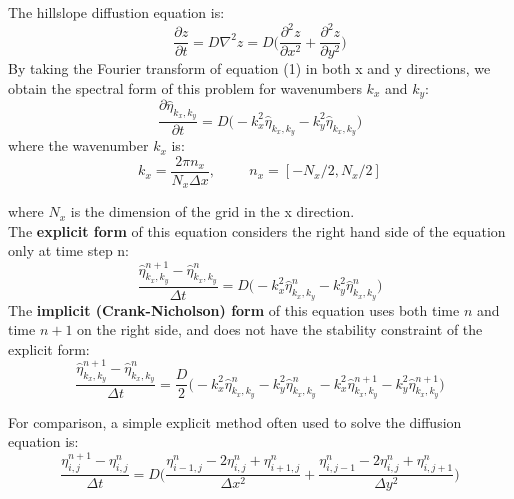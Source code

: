 \documentclass{article}
\begin{document}
The hillslope diffustion equation is:
\begin{equation}
    \frac{\partial z}{\partial t} = D \nabla^2 z = D \bigg( \frac{\partial^2 z}{\partial x^2} + \frac{\partial^2 z}{\partial y^2} \bigg)
\end{equation}
By taking the Fourier transform of equation (1) in both x and y directions, we obtain the spectral form of this problem for wavenumbers $k_x$ and $k_y$:
\begin{equation}
    \frac{\partial \hat{\eta}_{k_x,k_y}}{\partial t} = D \big(-k_x^2 \hat{\eta}_{k_x,k_y}  -k_y^2 \hat{\eta}_{k_x,k_y} \big)
\end{equation}
where the wavenumber $k_x$ is:
\begin{equation}
    k_x = \frac{2\pi n_x}{N_x \Delta x}, \hspace{1cm} n_x = [-N_x/2,N_x/2]
\end{equation}

where $N_x$ is the dimension of the grid in the x direction.\vspace{0.2cm} \\
The \textbf{explicit form} of this equation considers the right hand side of the equation only at time step n:
\begin{equation}
    \frac{\hat{\eta}^{n+1}_{k_x,k_y} - \hat{\eta}^{n}_{k_x,k_y}} {\Delta t} = D \big(-k_x^2 \hat{\eta}^{n}_{k_x,k_y}  -k_y^2 \hat{\eta}^{n}_{k_x,k_y} \big)
\end{equation}
The \textbf{implicit (Crank-Nicholson) form} of this equation uses both time $n$ and time $n+1$ on the right side, and does not have the stability constraint of the explicit form:
\begin{equation}
    \frac{\hat{\eta}^{n+1}_{k_x,k_y} - \hat{\eta}^{n}_{k_x,k_y}} {\Delta t} = \frac{D}{2} \big(-k_x^2 \hat{\eta}^{n}_{k_x,k_y}  -k_y^2 \hat{\eta}^{n}_{k_x,k_y} -k_x^2 \hat{\eta}^{n+1}_{k_x,k_y}  -k_y^2 \hat{\eta}^{n+1}_{k_x,k_y}\big)
\end{equation}

For comparison, a simple explicit method often used to solve the diffusion equation is:
\begin{equation}
   \frac{\eta_{i,j}^{n+1} - \eta_{i,j}^{n}}{\Delta t} = D\bigg( \frac{\eta_{i-1,j}^n - 2 \eta_{i,j}^n + \eta_{i+1,j}^n}{\Delta x^2} + \frac{\eta_{i,j-1}^n - 2 \eta_{i,j}^n + \eta_{i,j+1}^n}{\Delta y^2} \bigg)
\end{equation}
\end{document}
